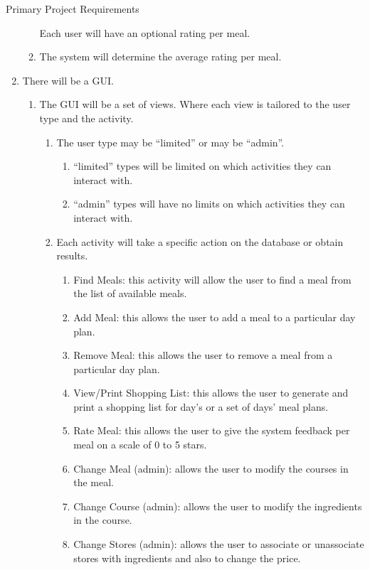 \documentclass[a4paper,10pt,toc=graduated]{article}
\begin{document}
\begin{mySubsection}{Primary Project Requirements}
\begin{enumerate}
\begin{enumerate}
Each user will have an optional rating per meal.
\item
The system will determine the average rating per meal.
\end{enumerate}
\item
There will be a GUI.
\begin{enumerate}
\item
The GUI will be a set of views. Where each view is tailored to the user type and the activity.
\begin{enumerate}
\item
The user type may be “limited” or may be “admin”.
\begin{enumerate}
\item
“limited” types will be limited on which activities they can interact with.
\item
“admin” types will have no limits on which activities they can interact with.
\end{enumerate}
\item
Each activity will take a specific action on the database or obtain results.
\begin{enumerate}
\item
Find Meals: this activity will allow the user to find a meal from the list of available meals.
\item
Add Meal: this allows the user to add a meal to a particular day plan.
\item
Remove Meal: this allows the user to remove a meal from a particular day plan.
\item
View/Print Shopping List: this allows the user to generate and print a shopping list for day’s or a set of days’ meal plans.
\item
Rate Meal: this allows the user to give the system feedback per meal on a scale of 0 to 5 stars.
\item
Change Meal (admin): allows the user to modify the courses in the meal.
\item
Change Course (admin): allows the user to modify the ingredients in the course.
\item
Change Stores (admin): allows the user to associate or unassociate stores with ingredients and also to change the price.
\end{enumerate}
\end{enumerate}
\end{enumerate}
\end{enumerate}
\end{mySubsection}
\end{document}
